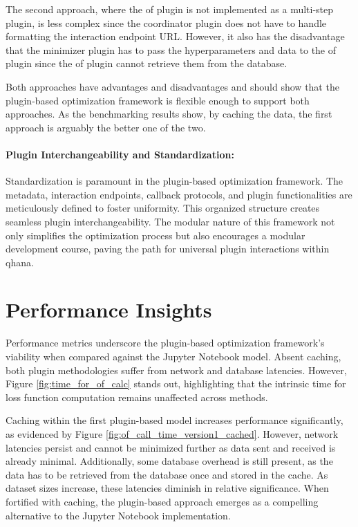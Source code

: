 \documentclass[
  a4paper,  %
  twoside,  %
  bibliography=totoc,
  headsepline,
  cleardoublepage=empty,
  parskip=half,
  draft=false
]{scrbook}
\begin{document}
The second approach, where the \gls{of} plugin is not implemented as a multi-step plugin, is less complex since the coordinator plugin does not have to handle formatting the interaction endpoint URL.
However, it also has the disadvantage that the minimizer plugin has to pass the hyperparameters and data to the \gls{of} plugin since the \gls{of} plugin cannot retrieve them from the database.

Both approaches have advantages and disadvantages and should show that the plugin-based optimization framework is flexible enough to support both approaches.
As the benchmarking results show, by caching the data, the first approach is arguably the better one of the two.


\paragraph{Plugin Interchangeability and Standardization:}
\label{sec:interchangeabilityAndStandardization}

Standardization is paramount in the plugin-based optimization framework.
The metadata, interaction endpoints, callback protocols, and plugin functionalities are meticulously defined to foster uniformity.
This organized structure creates seamless plugin interchangeability.
The modular nature of this framework not only simplifies the optimization process but also encourages a modular development course, paving the path for universal plugin interactions within \gls{qhana}.

\section{Performance Insights}
\label{sec:performanceAnalysis}

Performance metrics underscore the plugin-based optimization framework's viability when compared against the Jupyter Notebook model.
Absent caching, both plugin methodologies suffer from network and database latencies.
However, Figure \ref{fig:time_for_of_calc} stands out, highlighting that the intrinsic time for loss function computation remains unaffected across methods.

Caching within the first plugin-based model increases performance significantly, as evidenced by Figure \ref{fig:of_call_time_version1_cached}.
However, network latencies persist and cannot be minimized further as data sent and received is already minimal.
Additionally, some database overhead is still present, as the data has to be retrieved from the database once and stored in the cache.
As dataset sizes increase, these latencies diminish in relative significance.
When fortified with caching, the plugin-based approach emerges as a compelling alternative to the Jupyter Notebook implementation.
\end{document}
